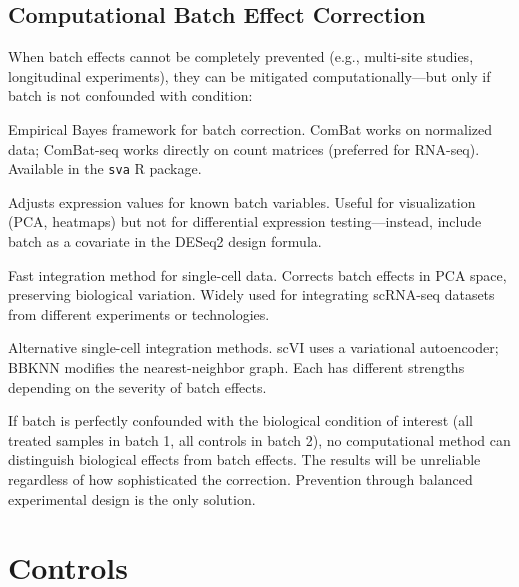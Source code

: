 \subsection{Computational Batch Effect Correction}

When batch effects cannot be completely prevented (e.g., multi-site studies, longitudinal experiments), they can be mitigated computationally---but only if batch is not confounded with condition:

\begin{description}[style=nextline, font=\bfseries, itemsep=3pt]
  \item[ComBat / ComBat-seq]
  Empirical Bayes framework for batch correction. ComBat works on normalized data; ComBat-seq works directly on count matrices (preferred for RNA-seq). Available in the \texttt{sva} R package.

  \item[limma::removeBatchEffect]
  Adjusts expression values for known batch variables. Useful for visualization (PCA, heatmaps) but not for differential expression testing---instead, include batch as a covariate in the DESeq2 design formula.

  \item[Harmony]
  Fast integration method for single-cell data. Corrects batch effects in PCA space, preserving biological variation. Widely used for integrating scRNA-seq datasets from different experiments or technologies.

  \item[Scanorama / scVI / BBKNN]
  Alternative single-cell integration methods. scVI uses a variational autoencoder; BBKNN modifies the nearest-neighbor graph. Each has different strengths depending on the severity of batch effects.
\end{description}

\begin{warningbox}[title={Batch Correction Cannot Fix Confounded Designs}]
If batch is perfectly confounded with the biological condition of interest (all treated samples in batch 1, all controls in batch 2), no computational method can distinguish biological effects from batch effects. The results will be unreliable regardless of how sophisticated the correction. Prevention through balanced experimental design is the only solution.
\end{warningbox}

\section{Controls}
\label{sec:expdesign:controls}

